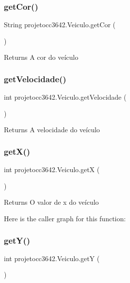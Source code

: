\subsubsection{get\+Cor()}
{\footnotesize\ttfamily String projetocc3642.\+Veiculo.\+get\+Cor (\begin{DoxyParamCaption}{ }\end{DoxyParamCaption})}

\begin{DoxyReturn}{Returns}
A cor do veículo 
\end{DoxyReturn}
\mbox{\label{classprojetocc3642_1_1_veiculo_a1ea0e0d3aea2ca519922b32153107fbd}} 
\subsubsection{get\+Velocidade()}
{\footnotesize\ttfamily int projetocc3642.\+Veiculo.\+get\+Velocidade (\begin{DoxyParamCaption}{ }\end{DoxyParamCaption})}

\begin{DoxyReturn}{Returns}
A velocidade do veículo 
\end{DoxyReturn}
\mbox{\label{classprojetocc3642_1_1_veiculo_ad7162bd5b883603e42b90cf8a866a02e}} 
\subsubsection{get\+X()}
{\footnotesize\ttfamily int projetocc3642.\+Veiculo.\+getX (\begin{DoxyParamCaption}{ }\end{DoxyParamCaption})}

\begin{DoxyReturn}{Returns}
O valor de x do veículo 
\end{DoxyReturn}
Here is the caller graph for this function\+:
\mbox{\label{classprojetocc3642_1_1_veiculo_add79df79902a08fd900ff9b988814233}} 
\subsubsection{get\+Y()}
{\footnotesize\ttfamily int projetocc3642.\+Veiculo.\+getY (\begin{DoxyParamCaption}{ }\end{DoxyParamCaption})}

